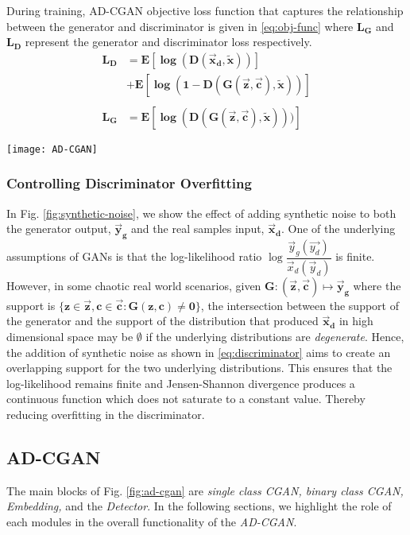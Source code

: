 During training, AD-CGAN objective loss function that captures the relationship between the generator and discriminator is given in \eqref{eq:obj-func} where $ \bm{L_G} $ and $ \bm{L_D} $ represent the generator and discriminator loss respectively.
\begin{equation}
\label{eq:obj-func}
\begin{aligned}
\bm{L_D} &= \bm{E[\log(D(\vec{x}_d,\widetilde{x}))]}\\
	& \bm{+E[\log(1-D(G(\vec{z},\vec{c}),\widetilde{x}))]} \\\\
\bm{L_G} &= \bm{E[\log(D(G(\vec{z},\vec{c}),\widetilde{x})))]}
\end{aligned}
\end{equation}
\begin{figure*}[h!]
	\centering
	\texttt{[image: AD-CGAN]}%
	\caption{AD-CGAN Framework for Anomaly Detection in Balanced and Imbalanced Data}
	\label{fig:ad-cgan}%
\end{figure*}
\subsubsection{Controlling Discriminator Overfitting}
\label{subsubsec:disc-overfit}
In Fig. \ref{fig:synthetic-noise}, we show the effect of adding synthetic noise to both the generator output, $ \bm{\vec{y}_g} $ and the real samples input, $ \bm{\vec{x}_d} $. One of the underlying assumptions of GANs is that the log-likelihood ratio $ \log \dfrac{\vec{y}_g(\vec{y_d})}{\vec{x}_d(\vec{y}_d)} $ is finite. However, in some chaotic real world scenarios, given $\bm{G:(\vec{z},\vec{c})}\longmapsto \bm{\vec{y}_{g}}  $ where the support is $ \{\bm{z\in\vec{z},c\in\vec{c}:G(z,c)\neq0}\} $, the intersection between the support of the generator and the support of the distribution that produced $ \bm{\vec{x}_d} $ in high dimensional space may be $ \emptyset $ if the underlying distributions are \textit{degenerate}. Hence, the addition of synthetic noise as shown in \eqref{eq:discriminator} aims to create an overlapping support for the two underlying distributions. This ensures that the log-likelihood remains finite and Jensen-Shannon divergence produces a continuous function which does not saturate to a constant value. Thereby reducing overfitting in the discriminator.

\subsection{AD-CGAN}
\label{subsec:ad-cgan}
The main blocks of Fig. \ref{fig:ad-cgan} are \textit{single class CGAN, binary class CGAN, Embedding,} and the \textit{Detector}. In the following sections, we highlight the role of each modules in the overall functionality of the \textit{AD-CGAN}. 
